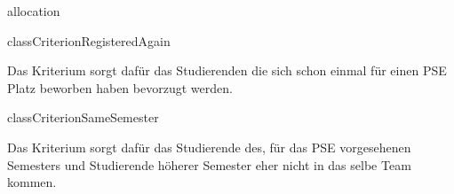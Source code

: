 \begin{texdocpackage}{allocation}
\begin{texdocclass}{class}{CriterionRegisteredAgain}
\label{texdoclet:allocation.CriterionRegisteredAgain}
\begin{texdocclassintro}
Das Kriterium sorgt dafür das Studierenden die sich schon einmal für einen PSE
 Platz beworben haben bevorzugt werden.\end{texdocclassintro}
\begin{texdocclassconstructors}
\end{texdocclassconstructors}
\begin{texdocclassmethods}
\end{texdocclassmethods}
\end{texdocclass}


\begin{texdocclass}{class}{CriterionSameSemester}
\label{texdoclet:allocation.CriterionSameSemester}
\begin{texdocclassintro}
Das Kriterium sorgt dafür das Studierende des, für das PSE vorgesehenen
 Semesters und Studierende höherer Semester eher nicht in das selbe Team kommen.\end{texdocclassintro}
\begin{texdocclassconstructors}
\end{texdocclassconstructors}
\begin{texdocclassmethods}
\end{texdocclassmethods}
\end{texdocclass}



\end{texdocpackage}
